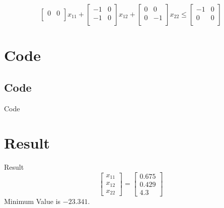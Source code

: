 \documentclass{beamer}
\begin{document}
\begin{frame}{}
\begin{equation*}
\begin{bmatrix}
            0 & 0  \\
        \end{bmatrix}
        x_{11} +
        \begin{bmatrix}
            -1 & 0  \\
            -1 & 0  \\
        \end{bmatrix}
        x_{12} +
        \begin{bmatrix}
            0 & 0  \\
            0 & -1  \\
        \end{bmatrix}
        x_{22} \leq
        \begin{bmatrix}
            -1 & 0  \\
            0 & 0  \\
        \end{bmatrix}
    \end{equation*}
    
\end{frame}
\section{Code}

\subsection{Code}

\begin{frame}{Code}

\end{frame}

\section{Result}
\begin{frame}{Result}
    \begin{equation*}
    \begin{bmatrix}
        x_{11} \\
        x_{12} \\
        x_{22} 
    \end{bmatrix}
    =
    \begin{bmatrix}
        0.675 \\
        0.429 \\
        4.3 
    \end{bmatrix}
        
\end{equation*}
Minimum Value is $-23.341$.

\end{frame}
\end{document}
